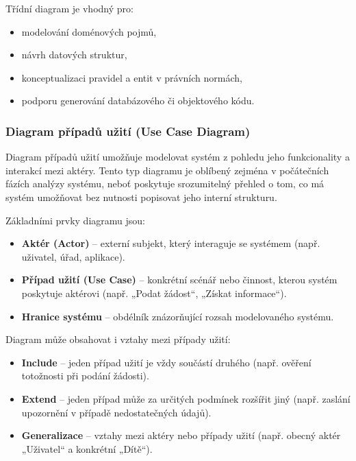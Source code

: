 Třídní diagram je vhodný pro:
\begin{itemize}
  \item modelování doménových pojmů,
  \item návrh datových struktur,
  \item konceptualizaci pravidel a entit v právních normách,
  \item podporu generování databázového či objektového kódu.\cite{Benabderrezak2024Class,Mlejnek2020Class}
\end{itemize}


\subsubsection{Diagram případů užití (Use Case Diagram)}
\label{sec:use-case-diagram}

Diagram případů užití umožňuje modelovat systém z pohledu jeho funkcionality a interakcí mezi aktéry. Tento typ diagramu je oblíbený zejména v počátečních fázích analýzy systému, neboť poskytuje srozumitelný přehled o tom, co má systém umožňovat bez nutnosti popisovat jeho interní strukturu. \cite{Mlejnek2020UseCase}

Základními prvky diagramu jsou:
\begin{itemize}
  \item \textbf{Aktér (Actor)} – externí subjekt, který interaguje se systémem (např. uživatel, úřad, aplikace).
  \item \textbf{Případ užití (Use Case)} – konkrétní scénář nebo činnost, kterou systém poskytuje aktérovi (např. „Podat žádost“, „Získat informace“).
  \item \textbf{Hranice systému} – obdélník znázorňující rozsah modelovaného systému.
\end{itemize}

Diagram může obsahovat i vztahy mezi případy užití:
\begin{itemize}
  \item \textbf{Include} – jeden případ užití je vždy součástí druhého (např. ověření totožnosti při podání žádosti).
  \item \textbf{Extend} – jeden případ může za určitých podmínek rozšířit jiný (např. zaslání upozornění v případě nedostatečných údajů).
  \item \textbf{Generalizace} – vztahy mezi aktéry nebo případy užití (např. obecný aktér „Uživatel“ a konkrétní „Dítě“).
\end{itemize}

